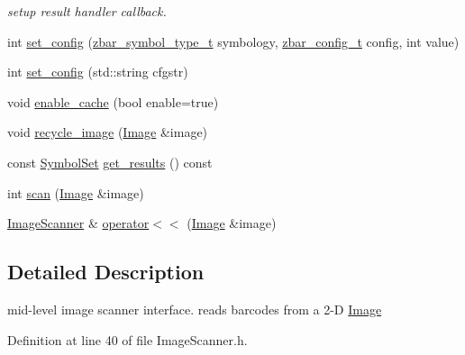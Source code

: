 \begin{DoxyCompactItemize}
\begin{DoxyCompactList}\small\item\em setup result handler callback. \end{DoxyCompactList}\item 
int \hyperlink{classzbar_1_1_image_scanner_abd75786c6fdcfd91fe46957ff6ee1ac3}{set\_\-config} (\hyperlink{zbar_8h_a74c1318b082084bdeaa7333b355f3e64}{zbar\_\-symbol\_\-type\_\-t} symbology, \hyperlink{zbar_8h_ae5ca63a2fe9ff3b63fc0d85995935a1d}{zbar\_\-config\_\-t} config, int value)
\item 
int \hyperlink{classzbar_1_1_image_scanner_afb7b0940d7887e9b4d5751f1e216aeb5}{set\_\-config} (std::string cfgstr)
\item 
void \hyperlink{classzbar_1_1_image_scanner_a003205308b9f405c1719a03da8cd857b}{enable\_\-cache} (bool enable=true)
\item 
void \hyperlink{classzbar_1_1_image_scanner_a5594742ec58d25713b258b003fe559a4}{recycle\_\-image} (\hyperlink{classzbar_1_1_image}{Image} \&image)
\item 
const \hyperlink{classzbar_1_1_symbol_set}{SymbolSet} \hyperlink{classzbar_1_1_image_scanner_a50ca440f2ff08a186cf0f4579268195b}{get\_\-results} () const 
\item 
int \hyperlink{classzbar_1_1_image_scanner_a707357b2df950f5101d7a3246701b205}{scan} (\hyperlink{classzbar_1_1_image}{Image} \&image)
\item 
\hyperlink{classzbar_1_1_image_scanner}{ImageScanner} \& \hyperlink{classzbar_1_1_image_scanner_aa06e5c7bbc25abf0ef5060836ed7b9a0}{operator$<$$<$} (\hyperlink{classzbar_1_1_image}{Image} \&image)
\end{DoxyCompactItemize}


\subsection{Detailed Description}
mid-\/level image scanner interface. reads barcodes from a 2-\/D \hyperlink{classzbar_1_1_image}{Image} 

Definition at line 40 of file ImageScanner.h.



